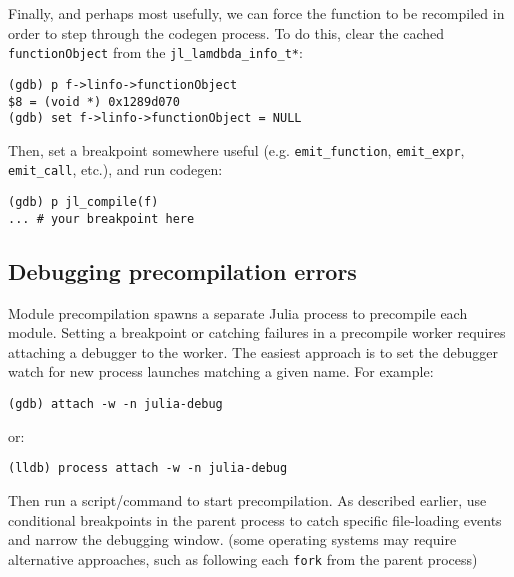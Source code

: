 Finally, and perhaps most usefully, we can force the function to be recompiled in order to step through the codegen process. To do this, clear the cached \texttt{functionObject} from the \texttt{jl\_lamdbda\_info\_t*}:




\begin{lstlisting}
(gdb) p f->linfo->functionObject
$8 = (void *) 0x1289d070
(gdb) set f->linfo->functionObject = NULL
\end{lstlisting}



Then, set a breakpoint somewhere useful (e.g. \texttt{emit\_function}, \texttt{emit\_expr}, \texttt{emit\_call}, etc.), and run codegen:




\begin{lstlisting}
(gdb) p jl_compile(f)
... # your breakpoint here
\end{lstlisting}



\hypertarget{15283936980874101721}{}


\subsection{Debugging precompilation errors}



Module precompilation spawns a separate Julia process to precompile each module. Setting a breakpoint or catching failures in a precompile worker requires attaching a debugger to the worker. The easiest approach is to set the debugger watch for new process launches matching a given name. For example:




\begin{lstlisting}
(gdb) attach -w -n julia-debug
\end{lstlisting}



or:




\begin{lstlisting}
(lldb) process attach -w -n julia-debug
\end{lstlisting}



Then run a script/command to start precompilation. As described earlier, use conditional breakpoints in the parent process to catch specific file-loading events and narrow the debugging window. (some operating systems may require alternative approaches, such as following each \texttt{fork} from the parent process)



